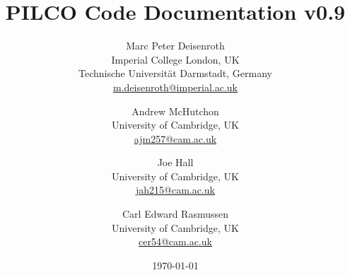\newcommand{\te}[1]{\text{#1}}
\newcommand{\dpp}{\mathrm{\partial}}
\newcommand{\pdiff}[2]{\frac{\dpp #1}{\dpp #2}}

\setcounter{secnumdepth}{3}

\title{\bf PILCO Code Documentation v0.9} 

\author{Marc Peter Deisenroth\\
Imperial College London, UK\\
Technische Universit\"at Darmstadt, Germany\\
\url{m.deisenroth@imperial.ac.uk}
 \and 
Andrew McHutchon\\
University of Cambridge, UK \\
\url{ajm257@cam.ac.uk}
\and 
Joe Hall\\
University of Cambridge, UK\\
\url{jah215@cam.ac.uk}
\and
 Carl Edward Rasmussen\\
University of Cambridge, UK\\
\url{cer54@cam.ac.uk}
}

\date{\today}

